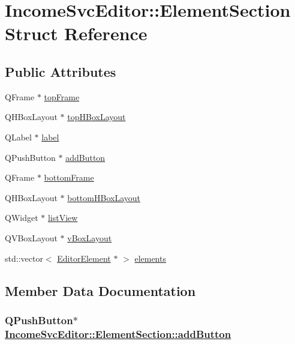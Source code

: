 \hypertarget{structIncomeSvcEditor_1_1ElementSection}{
\section{Income\-Svc\-Editor::Element\-Section Struct Reference}
\label{structIncomeSvcEditor_1_1ElementSection}
}
\subsection*{Public Attributes}
\begin{CompactItemize}
\item 
QFrame $\ast$ \hyperlink{structIncomeSvcEditor_1_1ElementSection_o0}{top\-Frame}
\item 
QHBox\-Layout $\ast$ \hyperlink{structIncomeSvcEditor_1_1ElementSection_o1}{top\-HBox\-Layout}
\item 
QLabel $\ast$ \hyperlink{structIncomeSvcEditor_1_1ElementSection_o2}{label}
\item 
QPush\-Button $\ast$ \hyperlink{structIncomeSvcEditor_1_1ElementSection_o3}{add\-Button}
\item 
QFrame $\ast$ \hyperlink{structIncomeSvcEditor_1_1ElementSection_o4}{bottom\-Frame}
\item 
QHBox\-Layout $\ast$ \hyperlink{structIncomeSvcEditor_1_1ElementSection_o5}{bottom\-HBox\-Layout}
\item 
QWidget $\ast$ \hyperlink{structIncomeSvcEditor_1_1ElementSection_o6}{list\-View}
\item 
QVBox\-Layout $\ast$ \hyperlink{structIncomeSvcEditor_1_1ElementSection_o7}{v\-Box\-Layout}
\item 
std::vector$<$ \hyperlink{classEditorElement}{Editor\-Element} $\ast$ $>$ \hyperlink{structIncomeSvcEditor_1_1ElementSection_o8}{elements}
\end{CompactItemize}


\subsection{Member Data Documentation}
\hypertarget{structIncomeSvcEditor_1_1ElementSection_o3}{
\subsubsection[addButton]{\setlength{\rightskip}{0pt plus 5cm}QPush\-Button$\ast$ \hyperlink{structIncomeSvcEditor_1_1ElementSection_o3}{Income\-Svc\-Editor::Element\-Section::add\-Button}}}
\label{structIncomeSvcEditor_1_1ElementSection_o3}


